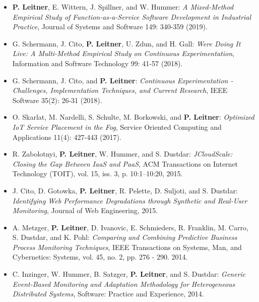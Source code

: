 \documentclass[paper=letter,fontsize=11pt]{scrartcl} %
\begin{document}
\begin{itemize}
\begin{shaded}
		\end{shaded}
	\item \textbf{P. Leitner}, E. Wittern, J. Spillner, and W. Hummer: \emph{A Mixed-Method Empirical Study of Function-as-a-Service Software Development in Industrial Practice}, Journal of Systems and Software 149: 340-359 (2019). 
		\item  G. Schermann, J. Cito, \textbf{P. Leitner}, U. Zdun, and H. Gall: \emph{We\textquotesingle{}re Doing It Live: A Multi-Method Empirical Study on Continuous Experimentation}, Information and Software Technology 99: 41-57 (2018).  
	\item  G. Schermann, J. Cito, and \textbf{P. Leitner}: \emph{Continuous Experimentation - Challenges, Implementation Techniques, and Current Research},  IEEE Software 35(2): 26-31 (2018). \\ 
	\item  O. Skarlat, M. Nardelli, S. Schulte, M. Borkowski, and \textbf{P. Leitner}: \emph{Optimized IoT Service Placement in the Fog}, Service Oriented Computing and Applications 11(4): 427-443 (2017). 
  \item  R. Zabolotnyi, \textbf{P. Leitner}, W. Hummer, and S. Dustdar: \emph{JCloudScale: Closing the Gap Between IaaS and PaaS}, ACM Transactions on Internet Technology (TOIT),  vol. 15, iss. 3, p. 10:1–10:20, 2015. 
  \item J. Cito, D. Gotowka, \textbf{P. Leitner}, R. Pelette, D. Suljoti, and S. Dustdar: \emph{Identifying Web Performance Degradations through Synthetic and Real-User Monitoring}, Journal of Web Engineering, 2015. 
  \item  A. Metzger, \textbf{P. Leitner}, D. Ivanovic, E. Schmieders, R. Franklin, M. Carro, S. Dustdar, and K. Pohl: \emph{Comparing and Combining Predictive Business Process Monitoring Techniques}, IEEE Transactions on Systems, Man, and Cybernetics: Systems, vol. 45, no. 2, pp. 276 - 290. 2014. 
  \item C. Inzinger, W. Hummer, B. Satzger, \textbf{P. Leitner}, and S. Dustdar: \emph{Generic Event-Based Monitoring and Adaptation Methodology for Heterogeneous Distributed Systems}, Software: Practice and Experience, 2014. 

\end{itemize}
\end{document}
